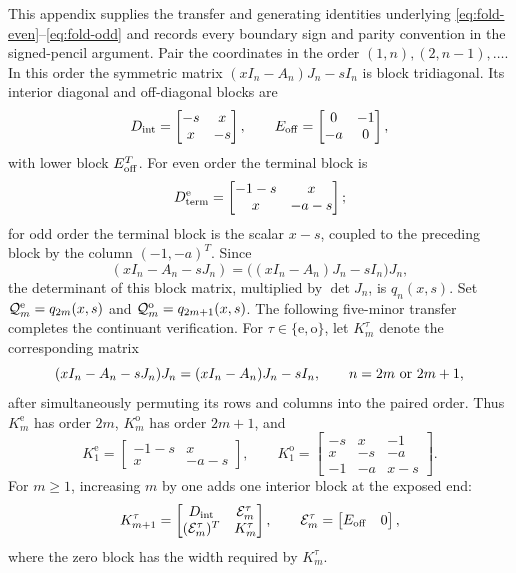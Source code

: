 \documentclass[12pt,anonymous]{iopjournal}
\numberwithin{equation}{section}
\theoremstyle{remark}
\begin{document}
This appendix supplies the transfer and generating identities underlying
\eqref{eq:fold-even}--\eqref{eq:fold-odd} and records every boundary sign
and parity convention in the signed-pencil argument.
Pair the coordinates in the order
\((1,n),(2,n-1),\ldots\).  In this order the symmetric matrix
\((xI_n-A_n)J_n-sI_n\) is block tridiagonal.  Its interior diagonal and
off-diagonal blocks are
\[
 D_{\rm int}=\begin{bmatrix}-s&x\\x&-s\end{bmatrix},
 \qquad
 E_{\rm off}=\begin{bmatrix}0&-1\\-a&0\end{bmatrix},
\]
with lower block \(E_{\rm off}^T\).  For even order the terminal block is
\[
 D_{\rm term}^{\rm e}=\begin{bmatrix}-1-s&x\\x&-a-s\end{bmatrix};
\]
for odd order the terminal block is the scalar \(x-s\), coupled to the
preceding block by the column \((-1,-a)^T\).  Since
\[
 (xI_n-A_n-sJ_n)=\bigl((xI_n-A_n)J_n-sI_n\bigr)J_n,
\]
the determinant of this block matrix, multiplied by \(\det J_n\), is
\(q_n(x,s)\).  Set \(\mathcal Q_m^{\rm e}=q_{2m}(x,s)\) and
\(\mathcal Q_m^{\rm o}=q_{2m+1}(x,s)\).  The following five-minor transfer
completes the continuant verification.
For \(\tau\in\{\mathrm e,\mathrm o\}\), let \(K_m^\tau\) denote the
corresponding matrix
\[
 (xI_n-A_n-sJ_n)J_n=(xI_n-A_n)J_n-sI_n,
 \qquad n=2m\ \hbox{or}\ 2m+1,
\]
after simultaneously permuting its rows and columns into the paired
order.  Thus \(K_m^{\mathrm e}\) has order \(2m\),
\(K_m^{\mathrm o}\) has order \(2m+1\), and
\[
 K_1^{\mathrm e}=
 \begin{bmatrix}-1-s&x\\x&-a-s\end{bmatrix},
 \qquad
 K_1^{\mathrm o}=
 \begin{bmatrix}
 -s&x&-1\\
 x&-s&-a\\
 -1&-a&x-s
 \end{bmatrix}.
\]
For \(m\geq1\), increasing \(m\) by one adds one interior block at the
exposed end:
\begin{equation}\label{eq:fold-block-extension}
 K_{m+1}^\tau=
 \begin{bmatrix}
  D_{\rm int}&\mathcal E_m^\tau\\
  (\mathcal E_m^\tau)^T&K_m^\tau
 \end{bmatrix},
 \qquad
 \mathcal E_m^\tau=
 \begin{bmatrix}E_{\rm off}&0\end{bmatrix},
\end{equation}
where the zero block has the width required by \(K_m^\tau\).
\end{document}
